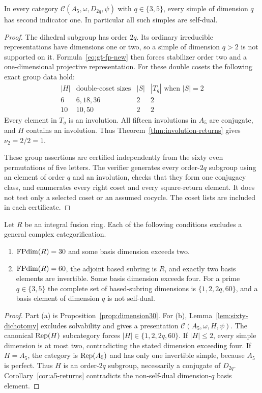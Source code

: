 \begin{corollary}\label{cor:a5-returns}
In every category $\mathcal C(A_5,\omega,D_{2q},\psi)$ with
$q\in\{3,5\}$, every simple of dimension $q$ has second indicator one.
In particular all such simples are self-dual.
\end{corollary}
\begin{proof}
The dihedral subgroup has order $2q$. Its ordinary irreducible
representations have dimensions one or two, so a simple of dimension
$q>2$ is not supported on it. Formula~\eqref{eq:gt-fp-new} then forces
stabilizer order two and a one-dimensional projective representation.
For these double cosets the following exact group data hold:
\[
\begin{array}{c|c|c|c}
 |H|&\text{double-coset sizes}&|S|&|T_g|\text{ when }|S|=2\\\hline
 6&6,18,36&2&2\\
 10&10,50&2&2
\end{array}
\]
Every element in $T_g$ is an involution. All fifteen involutions in $A_5$
are conjugate, and $H$ contains an involution. Thus
Theorem~\ref{thm:involution-returns} gives $\nu_2=2/2=1$.

These group assertions are certified independently from the sixty even
permutations of five letters. The verifier generates every order-$2q$
subgroup using an element of order $q$ and an involution, checks that they
form one conjugacy class, and enumerates every right coset and every
square-return element. It does not test only a selected coset or an
assumed cocycle. The coset lists are included in each certificate.
\end{proof}

\begin{theorem}\label{thm:small-morita}
Let $R$ be an integral fusion ring. Each of the following conditions
excludes a general complex categorification.
\begin{enumerate}[label=\textup{(\alph*)}]
\item $\operatorname{FPdim}(R)=30$ and some basis dimension exceeds two.
\item $\operatorname{FPdim}(R)=60$, the adjoint based subring is $R$, and exactly two
basis elements are invertible. Some basis dimension exceeds four.
For a prime $q\in\{3,5\}$ the complete set of based-subring dimensions is
$\{1,2,2q,60\}$, and a basis element of dimension $q$ is not self-dual.
\end{enumerate}
\end{theorem}
\begin{proof}
Part (a) is Proposition~\ref{prop:dimension30}.
For (b), Lemma~\ref{lem:sixty-dichotomy} excludes solvability and gives a
presentation $\mathcal C(A_5,\omega,H,\psi)$.
The canonical $\operatorname{Rep}(H)$ subcategory forces
$|H|\in\{1,2,2q,60\}$. If $|H|\leq2$, every simple dimension is at most
two, contradicting the stated dimension exceeding four. If $H=A_5$,
the category is $\operatorname{Rep}(A_5)$ and has only one invertible simple, because
$A_5$ is perfect. Thus $H$ is an order-$2q$ subgroup, necessarily a
conjugate of $D_{2q}$. Corollary~\ref{cor:a5-returns} contradicts the
non-self-dual dimension-$q$ basis element.
\end{proof}

